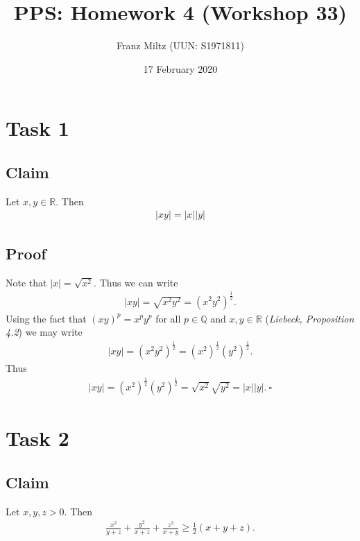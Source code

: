 \documentclass{article}
\title{PPS: Homework 4 (Workshop 33)}
\author{Franz Miltz (UUN: S1971811)}
\date{17 February 2020}
\begin{document}
\maketitle
\section*{Task 1}
\subsection*{Claim}
Let $x,y\in\mathbb{R}$. Then
\begin{align*}
	|xy|=|x||y|
\end{align*}
\subsection*{Proof}
Note that $|x|=\sqrt{x^2}$. Thus we can write
\begin{align*}
	|xy|=\sqrt{x^2y^2}=(x^2y^2)^\frac{1}{2}.
\end{align*}
Using the fact that $(xy)^p=x^py^p$ for all $p\in\mathbb{Q}$ and $x,y\in\mathbb{R}$ (\emph{Liebeck, Proposition 4.2}) we may write
\begin{align*}
	|xy|=(x^2y^2)^\frac{1}{2}=(x^2)^\frac{1}{2}(y^2)^\frac{1}{2}.
\end{align*}
Thus
\begin{align*}
	|xy|=(x^2)^\frac{1}{2}(y^2)^\frac{1}{2}=\sqrt{x^2}\sqrt{y^2}=|x||y|.\:\square
\end{align*}
\section*{Task 2}
\subsection*{Claim}
Let $x,y,z>0$. Then
\begin{align*}
	\frac{x^2}{y+z}+\frac{y^2}{x+z}+\frac{z^2}{x+y}\geq\frac{1}{2}(x+y+z).
\end{align*}
\end{document}
